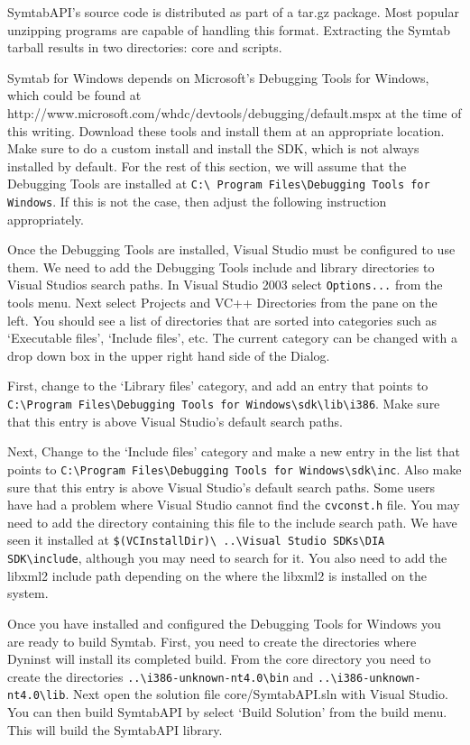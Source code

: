 SymtabAPI's source code is distributed as part of a tar.gz package. Most popular
unzipping programs are capable of handling this format. Extracting the Symtab
tarball results in two directories: core and scripts. 

Symtab for Windows depends on Microsoft's Debugging Tools for Windows, which
could be found at http://www.microsoft.com/whdc/devtools/debugging/default.mspx
at the time of this writing. Download these tools and install them at an
appropriate location. Make sure to do a custom install and install the SDK,
which is not always installed by default. For the rest of this section, we will
assume that the Debugging Tools are installed at \texttt{C:\textbackslash
    Program Files\textbackslash Debugging
Tools for Windows}. If this is not the case, then adjust the following
instruction appropriately.

Once the Debugging Tools are installed, Visual Studio must be configured to use
them. We need to add the Debugging Tools include and library directories to
Visual Studios search paths. In Visual Studio 2003 select \texttt{Options...} from the
tools menu. Next select Projects and VC++ Directories from the pane on the left.
You should see a list of directories that are sorted into categories such as
`Executable files', `Include files', etc. The current category can
be changed with a drop down box in the upper right hand side of the Dialog. 

First, change to the `Library files' category, and add an entry that
points to \\
\texttt{C:\textbackslash Program Files\textbackslash Debugging Tools
for Windows\textbackslash sdk\textbackslash lib\textbackslash i386}. Make sure
that this entry is above Visual Studio's default search paths.

Next, Change to the `Include files' category and make a new entry in the
list that points to \texttt{C:\textbackslash Program Files\textbackslash Debugging Tools for
Windows\textbackslash sdk\textbackslash inc}. Also
make sure that this entry is above Visual Studio's default search paths. Some
users have had a problem where Visual Studio cannot find the \texttt{cvconst.h} file. You
may need to add the directory containing this file to the include search path.
We have seen it installed at \texttt{\$(VCInstallDir)\textbackslash
    ..\textbackslash Visual Studio SDKs\textbackslash DIA
SDK\textbackslash include}, although you may need to search for it. You also need to add the
libxml2 include path depending on the where the libxml2 is installed on the
system.  

Once you have installed and configured the Debugging Tools for Windows
you are ready to build Symtab. First, you need to create the directories where
Dyninst will install its completed build. From the core directory you need to
create the directories \texttt{..\textbackslash i386-unknown-nt4.0\textbackslash bin} and
\texttt{..\textbackslash i386-unknown-nt4.0\textbackslash lib}.
Next open the solution file core/SymtabAPI.sln with Visual Studio.   You can
then build SymtabAPI by select `Build Solution' from the build menu. This
will build the SymtabAPI library.

